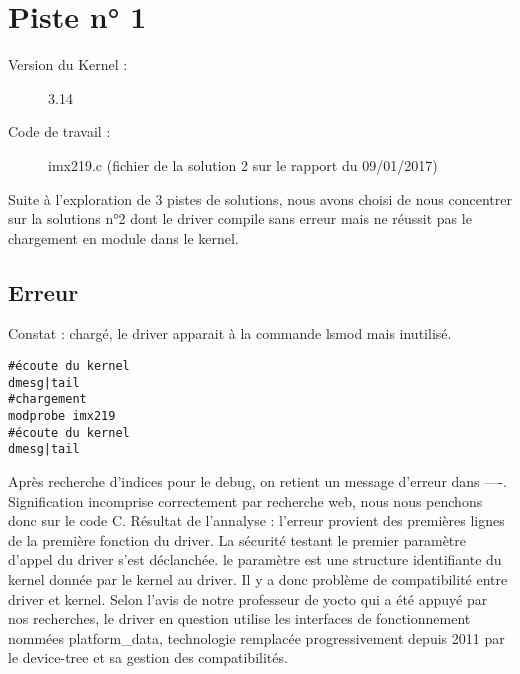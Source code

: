 \chapter{Piste n° 1} %
\label{Chapter2} %

\begin{description}
  \item[Version du Kernel :] 3.14
  \item[Code de travail :] imx219.c (fichier de la solution 2 sur le rapport du
  09/01/2017)
\end{description}

Suite à l'exploration de 3 pistes de solutions, nous avons choisi de nous
concentrer sur la solutions n°2 dont le driver compile sans erreur mais ne
réussit pas le chargement en module dans le kernel.

\section{Erreur}
Constat : chargé, le driver apparait à la commande lsmod mais inutilisé.

\begin{lstlisting}
#écoute du kernel
dmesg|tail
#chargement
modprobe imx219
#écoute du kernel
dmesg|tail
\end{lstlisting}
Après recherche d'indices pour le debug, on retient un message d'erreur dans ----.
Signification incomprise correctement par recherche web, nous nous penchons donc
sur le code C. Résultat de l'annalyse :
l'erreur provient des premières lignes de la première fonction du driver. La
sécurité testant le premier paramètre d'appel du driver s'est déclanchée. le
paramètre est une structure identifiante du kernel donnée par le kernel au
driver. Il y a donc problème de compatibilité entre driver et kernel. Selon
l'avis de notre professeur de yocto qui a été appuyé par nos recherches,
le driver en question utilise les interfaces de fonctionnement nommées
platform\_data, technologie remplacée progressivement depuis 2011 par le
device-tree et sa gestion des compatibilités.

